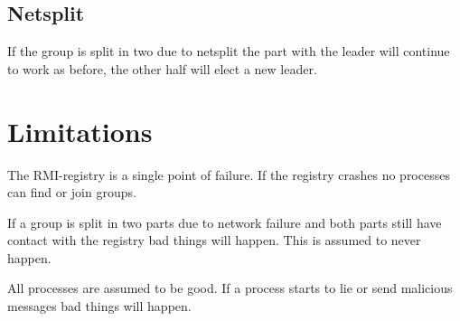 \documentclass[11pt,swedish]{article}
\begin{document}
\subsection{Netsplit}
If the group is split in two due to netsplit the part with the leader will continue to work as before, the other half will elect a new leader.

\section{Limitations}
The RMI-registry is a single point of failure. If the registry crashes no processes can find or join groups. 

If a group is split in two parts due to network failure and both parts still have contact  with the registry bad things will happen. This is assumed to never happen.

All processes are assumed to be good. If a process starts to lie or send malicious messages bad things will happen.
\end{document}
